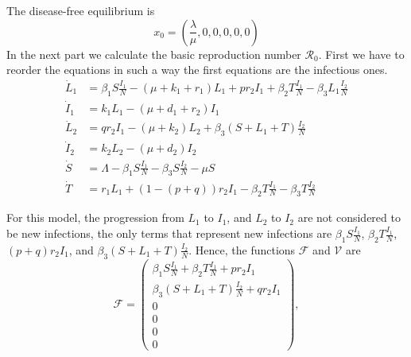     
    The disease-free equilibrium is 
    $$
        x_0 = \left(\frac{\lambda}{\mu}, 0 , 0 ,0, 0, 0\right)
    $$
    In the next part we calculate the basic reproduction number $\mathscr{R}_{0}$. 
    First we have to reorder the equations in such a way the first equations
    are the infectious ones.
    \begin{align*}
        \dot{L}_1 &= 
        	\beta_{1}S \frac{I_1}{N} - (\mu + k_1 + r_1)L_{1} + 
            pr_2 I_1 + \beta_{2} T \frac{I_1}{N} -
            \beta_{3} L_{1}\frac{I_2}{N}  
            \\
        \dot{I}_1 &=  
        	k_1 L_{1} - (\mu + d_1 + r_2)I_1  
            \\
        \dot{L}_2 &=  
        	q r_2 I_1 - (\mu + k_2)L_2 + \beta_{3}(S + L_1 + 
            T)\frac{I_2}{N}  
            \\
        \dot{I}_2 &=  
        	k_2 L_2 - (\mu + d_2)I_2  
            \\
        \dot{S}	&= 
        	\Lambda -\beta_{1} S \frac{I_1}{N} - \beta_{3}S\frac{I_2}{N} - 
            \mu S 
            \\
        \dot{T} &=  
        	r_1 L_{1} + (1-(p+q))r_2 I_1 - \beta_{2} T \frac{I_1}{N} - 
            \beta_{3}T\frac{I_2}{N}  
    \end{align*}
    
    \noindent For this model, the progression from $L_1$ to $I_1$, and $L_2$ 
    to $I_2$ are 
    not considered to be new infections, the only terms that represent new infections
    are $ \beta_{1} S \frac{I_1}{N}$, $\beta_{2} T \frac{I_1}{N}$,  $(p + q )r_2 I_1$, and
    $\beta_{3} (S + L_{1} + T)\frac{I_2}{N} $. Hence, the functions $\mathscr{F}$ and 
    $\mathscr{V}$ are
    \begin{equation*}
        \mathscr{F} = 
            \begin{pmatrix}
                \beta_{1} S \frac{I_1}{N} + \beta_{2} T \frac{I_1}{N} + p r_2 I_1 \\
                \beta_{3} (S + L_{1} + T)\frac{I_2}{N} + q r_2 I_1 \\
                0 \\
                0 \\
                0 \\
                0
            \end{pmatrix},
    \end{equation*}
    
